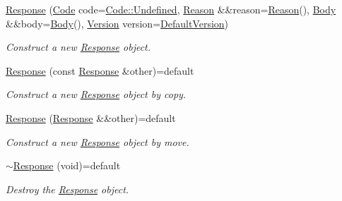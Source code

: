 \begin{DoxyCompactItemize}
\item 
\mbox{\hyperlink{classo_z_1_1_h_t_t_p_1_1_response_a0f77c44152124e9fb1d123138fd44552}{Response}} (\mbox{\hyperlink{namespaceo_z_1_1_h_t_t_p_acd43703151305f79b1e2f42e98ee8199}{Code}} code=\mbox{\hyperlink{namespaceo_z_1_1_h_t_t_p_acd43703151305f79b1e2f42e98ee8199aec0fc0100c4fc1ce4eea230c3dc10360}{Code\+::\+Undefined}}, \mbox{\hyperlink{namespaceo_z_1_1_h_t_t_p_afcd8b91e5e8a7b6df0a7b3b298ec3965}{Reason}} \&\&reason=\mbox{\hyperlink{namespaceo_z_1_1_h_t_t_p_afcd8b91e5e8a7b6df0a7b3b298ec3965}{Reason}}(), \mbox{\hyperlink{namespaceo_z_1_1_h_t_t_p_a270c38b9f9b6228ce430fda6d5b150d6}{Body}} \&\&body=\mbox{\hyperlink{namespaceo_z_1_1_h_t_t_p_a270c38b9f9b6228ce430fda6d5b150d6}{Body}}(), \mbox{\hyperlink{structo_z_1_1_h_t_t_p_1_1_version}{Version}} version=\mbox{\hyperlink{namespaceo_z_1_1_h_t_t_p_af1d13b042d8595fb3196ce91c5c4955d}{Default\+Version}})
\begin{DoxyCompactList}\small\item\em Construct a new \mbox{\hyperlink{classo_z_1_1_h_t_t_p_1_1_response}{Response}} object. \end{DoxyCompactList}\item 
\mbox{\hyperlink{classo_z_1_1_h_t_t_p_1_1_response_a917512ce455c189e139f861d68268997}{Response}} (const \mbox{\hyperlink{classo_z_1_1_h_t_t_p_1_1_response}{Response}} \&other)=default
\begin{DoxyCompactList}\small\item\em Construct a new \mbox{\hyperlink{classo_z_1_1_h_t_t_p_1_1_response}{Response}} object by copy. \end{DoxyCompactList}\item 
\mbox{\hyperlink{classo_z_1_1_h_t_t_p_1_1_response_a3a709877eff1de8e3f0695421a616a5f}{Response}} (\mbox{\hyperlink{classo_z_1_1_h_t_t_p_1_1_response}{Response}} \&\&other)=default
\begin{DoxyCompactList}\small\item\em Construct a new \mbox{\hyperlink{classo_z_1_1_h_t_t_p_1_1_response}{Response}} object by move. \end{DoxyCompactList}\item 
\mbox{\hyperlink{classo_z_1_1_h_t_t_p_1_1_response_aa88d97261700d9a915fb8fdcc7ab42f5}{$\sim$\+Response}} (void)=default
\begin{DoxyCompactList}\small\item\em Destroy the \mbox{\hyperlink{classo_z_1_1_h_t_t_p_1_1_response}{Response}} object. \end{DoxyCompactList}\item 

\end{DoxyCompactItemize}
